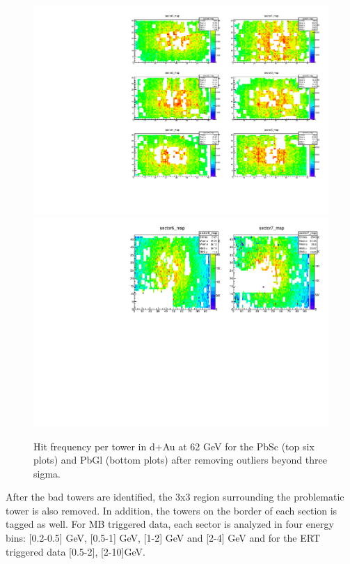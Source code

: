 \documentclass{article}
\begin{document}
\begin{figure}
  \centering
  \includegraphics[width=1\textwidth]{fig_pi0vn/deadmap_sect0-5_62GEV.pdf}
  \includegraphics[width=1\textwidth]{fig_pi0vn/deadmap_sect6-7_62GEV.pdf}
  \caption{Hit frequency per tower in d+Au at 62 GeV for the PbSc (top six plots) and PbGl (bottom plots) after removing outliers beyond three sigma.}
  \label{sectmasked.62GeV}
\end{figure}
After the bad towers are identified, the 3x3 region surrounding the problematic tower is also removed.
In addition, the towers on the border of each section is tagged as well.
For MB triggered data, each sector is analyzed in four energy bins: [0.2-0.5] GeV, [0.5-1] GeV, [1-2] GeV and [2-4] GeV and for the ERT triggered data [0.5-2], [2-10]GeV.
\newline
\end{document}

